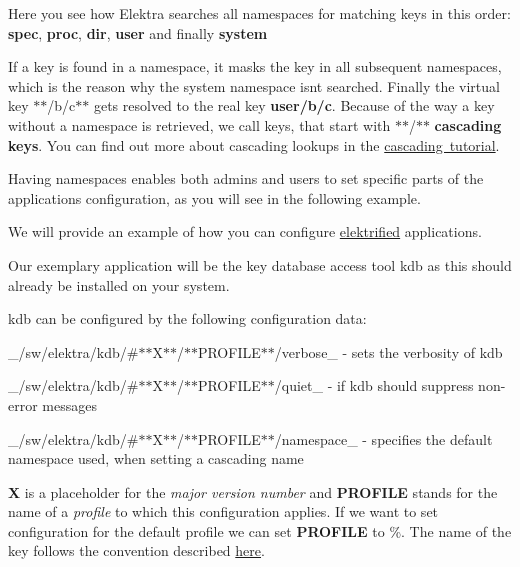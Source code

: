 Here you see how Elektra searches all namespaces for matching keys in this order\+: {\bfseries{spec}}, {\bfseries{proc}}, {\bfseries{dir}}, {\bfseries{user}} and finally {\bfseries{system}}

If a key is found in a namespace, it masks the key in all subsequent namespaces, which is the reason why the system namespace isn\textquotesingle{}t searched. Finally the virtual key $\ast$$\ast$/b/c$\ast$$\ast$ gets resolved to the real key {\bfseries{user/b/c}}. Because of the way a key without a namespace is retrieved, we call keys, that start with \textquotesingle{}$\ast$$\ast$/$\ast$$\ast$\textquotesingle{} {\bfseries{cascading keys}}. You can find out more about cascading lookups in the \mbox{\hyperlink{doc_tutorials_cascading_md}{cascading tutorial}}.

Having namespaces enables both admins and users to set specific parts of the application\textquotesingle{}s configuration, as you will see in the following example.

We will provide an example of how you can configure \mbox{\hyperlink{doc_help_elektra-glossary_md}{elektrified}} applications.

Our exemplary application will be the key database access tool {\ttfamily kdb} as this should already be installed on your system.

{\ttfamily kdb} can be configured by the following configuration data\+:


\begin{DoxyItemize}
\item \+\_\+/sw/elektra/kdb/\#$\ast$$\ast$\+X$\ast$$\ast$/$\ast$$\ast$\+P\+R\+O\+F\+I\+L\+E$\ast$$\ast$/verbose\+\_\+ -\/ sets the verbosity of kdb
\item \+\_\+/sw/elektra/kdb/\#$\ast$$\ast$\+X$\ast$$\ast$/$\ast$$\ast$\+P\+R\+O\+F\+I\+L\+E$\ast$$\ast$/quiet\+\_\+ -\/ if kdb should suppress non-\/error messages
\item \+\_\+/sw/elektra/kdb/\#$\ast$$\ast$\+X$\ast$$\ast$/$\ast$$\ast$\+P\+R\+O\+F\+I\+L\+E$\ast$$\ast$/namespace\+\_\+ -\/ specifies the default namespace used, when setting a cascading name
\end{DoxyItemize}

{\bfseries{X}} is a placeholder for the {\itshape major version number} and {\bfseries{P\+R\+O\+F\+I\+LE}} stands for the name of a {\itshape profile} to which this configuration applies. If we want to set configuration for the default profile we can set {\bfseries{P\+R\+O\+F\+I\+LE}} to \%. The name of the key follows the convention described \mbox{\hyperlink{doc_help_elektra-key-names_md}{here}}.

